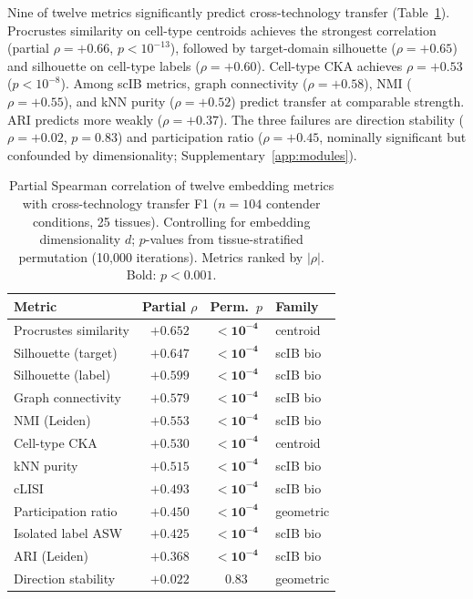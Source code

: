 \documentclass[11pt]{article}
\begin{document}
Nine of twelve metrics significantly predict cross-technology transfer
(Table~\ref{tab:metrics}). Procrustes similarity on cell-type centroids
achieves the strongest correlation (partial $\rho = +0.66$,
$p < 10^{-13}$), followed by target-domain silhouette ($\rho = +0.65$)
and silhouette on cell-type labels ($\rho = +0.60$). Cell-type CKA
achieves $\rho = +0.53$ ($p < 10^{-8}$). Among scIB metrics, graph
connectivity ($\rho = +0.58$), NMI ($\rho = +0.55$), and kNN purity
($\rho = +0.52$) predict transfer at comparable strength. ARI predicts
more weakly ($\rho = +0.37$). The three failures are
direction stability ($\rho = +0.02$, $p = 0.83$) and
participation ratio ($\rho = +0.45$, nominally significant but
confounded by dimensionality; Supplementary~\ref{app:modules}).

\begin{table}[t]
\centering
\caption{Partial Spearman correlation of twelve embedding metrics with
cross-technology transfer F1 ($n = 104$ contender conditions, 25
tissues). Controlling for embedding dimensionality $d$; $p$-values from
tissue-stratified permutation (10,000 iterations). Metrics ranked by
$|\rho|$. Bold: $p < 0.001$.}
\label{tab:metrics}
\small
\begin{tabular}{@{}lccl@{}}
\toprule
Metric & Partial $\rho$ & Perm.\ $p$ & Family \\
\midrule
Procrustes similarity   & $+0.652$ & $\mathbf{< 10^{-4}}$ & centroid \\
Silhouette (target)     & $+0.647$ & $\mathbf{< 10^{-4}}$ & scIB bio \\
Silhouette (label)      & $+0.599$ & $\mathbf{< 10^{-4}}$ & scIB bio \\
Graph connectivity      & $+0.579$ & $\mathbf{< 10^{-4}}$ & scIB bio \\
NMI (Leiden)            & $+0.553$ & $\mathbf{< 10^{-4}}$ & scIB bio \\
Cell-type CKA           & $+0.530$ & $\mathbf{< 10^{-4}}$ & centroid \\
kNN purity              & $+0.515$ & $\mathbf{< 10^{-4}}$ & scIB bio \\
cLISI                   & $+0.493$ & $\mathbf{< 10^{-4}}$ & scIB bio \\
Participation ratio     & $+0.450$ & $\mathbf{< 10^{-4}}$ & geometric \\
Isolated label ASW      & $+0.425$ & $\mathbf{< 10^{-4}}$ & scIB bio \\
ARI (Leiden)            & $+0.368$ & $\mathbf{< 10^{-4}}$ & scIB bio \\
Direction stability     & $+0.022$ & $0.83$               & geometric \\
\bottomrule
\end{tabular}
\end{table}
\end{document}
